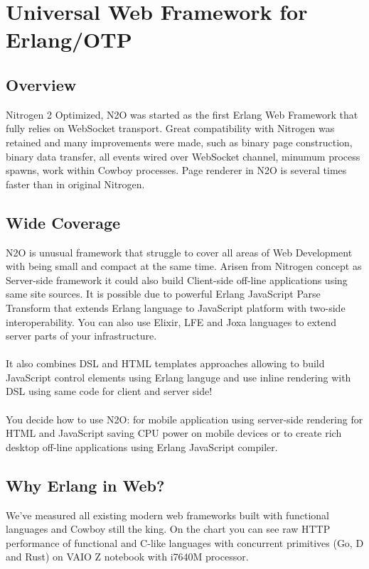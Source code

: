 \section{Universal Web Framework for Erlang/OTP}

\subsection*{Overview}
Nitrogen 2 Optimized, N2O was started as the first Erlang Web Framework
that fully relies on WebSocket transport. Great compatibility with Nitrogen
was retained and many improvements were made, such as binary page construction,
binary data transfer, all events wired over WebSocket channel, minumum process spawns,
work within Cowboy processes. Page renderer in N2O is several times faster
than in original Nitrogen.

\subsection*{Wide Coverage}
N2O is unusual framework that struggle to cover all areas of Web Development
with being small and compact at the same time. Arisen from Nitrogen concept
as Server-side framework it could also build Client-side off-line applications
using same site sources. It is possible due to powerful Erlang JavaScript Parse
Transform that extends Erlang language to JavaScript platform with two-side
interoperability. You can also use Elixir, LFE and Joxa languages to extend
server parts of your infrastructure.

\paragraph{}
It also combines DSL and HTML templates approaches allowing to build JavaScript
control elements using Erlang languge and use inline rendering with DSL using
same code for client and server side!

\paragraph{}
You decide how to use N2O: for mobile application using server-side rendering
for HTML and JavaScript saving CPU power on mobile devices or to create rich desktop
off-line applications using Erlang JavaScript compiler.

\subsection*{Why Erlang in Web?}
We've measured all existing modern web frameworks built with functional languages and Cowboy still the king.
On the chart you can see raw HTTP performance of functional and C-like languages with concurrent primitives (Go, D and Rust)
on VAIO Z notebook with i7640M processor.

